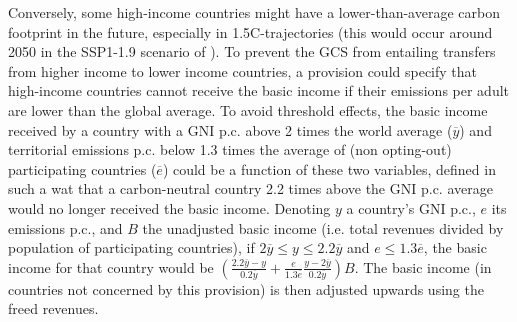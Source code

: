 \documentclass[12pt,english]{article}
\begin{document}
Conversely, some high-income countries might have a lower-than-average carbon footprint in the future, especially in 1.5\textdegree{}C-trajectories (this would occur around 2050 in the SSP1-1.9 scenario of \citealp{van_vuuren_energy_2017}). To prevent the GCS from entailing transfers from higher income to lower income countries, a provision could specify that high-income countries cannot receive the basic income if their emissions per adult are lower than the global average. To avoid threshold effects, the basic income received by a country with a GNI p.c. above 2 times the world average ($\overline{y}$) and territorial emissions p.c. below 1.3 times the average of (non opting-out) participating countries ($\overline{e}$) could be a function of these two variables, defined in such a wat that a carbon-neutral country 2.2 times above the GNI p.c. average would no longer received the basic income. Denoting $y$ a country's GNI p.c., $e$ its emissions p.c., and $B$ the unadjusted basic income (i.e. total revenues divided by population of participating countries), if $2\overline{y}\leq y\leq 2.2\overline{y}$ and $e \leq 1.3 \overline{e}$, the basic income for that country would be $\left( \frac{2.2\overline{y}-y}{0.2\overline{y}} + \frac{e}{1.3\overline{e}} \frac{y-2\overline{y}}{0.2\overline{y}} \right) B$. The basic income (in countries not concerned by this provision) is then adjusted upwards using the freed revenues.


\end{document}

